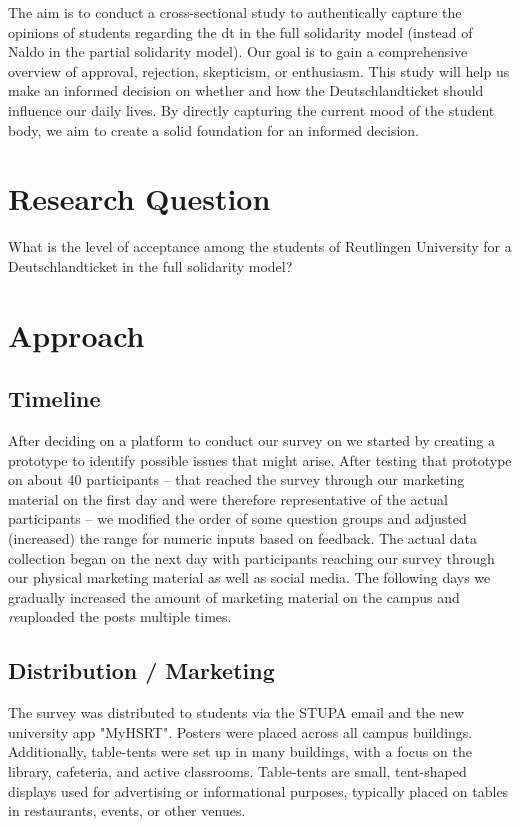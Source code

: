 The aim is to conduct a cross-sectional study to authentically capture the opinions of students regarding the \acrshort{dt} in the full solidarity model (instead of Naldo in the partial solidarity model). Our goal is to gain a comprehensive overview of approval, rejection, skepticism, or enthusiasm. This study will help us make an informed decision on whether and how the Deutschlandticket should influence our daily lives. By directly capturing the current mood of the student body, we aim to create a solid foundation for an informed decision.

\section{Research Question}

What is the level of acceptance among the students of Reutlingen University for a Deutschlandticket in the full solidarity model?

\section{Approach}
\subsection{Timeline}
After deciding on a platform to conduct our survey on we started by creating a prototype to identify possible issues that might arise. After testing that prototype on about 40 participants -- that reached the survey through our marketing material on the first day and were therefore representative of the actual participants -- we modified the order of some question groups and adjusted (increased) the range for numeric inputs based on feedback. The actual data collection began on the next day with participants reaching our survey through our physical marketing material as well as social media. The following days we gradually increased the amount of marketing material on the campus and \textit{re}uploaded the posts multiple times.

\subsection{Distribution / Marketing}

The survey was distributed to students via the STUPA email and the new university app "MyHSRT". Posters were placed across all campus buildings. Additionally, table-tents were set up in many buildings, with a focus on the library, cafeteria, and active classrooms. Table-tents are small, tent-shaped displays used for advertising or informational purposes, typically placed on tables in restaurants, events, or other venues.

